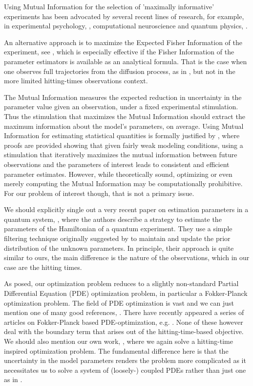 \documentclass{article}
\begin{document}
Using Mutual Information for the selection of 'maximally informative'
experiments has been advocated by several recent lines of research, for example,
in experimental psychology, \cite{Cavagnaro2010,Myung2013}, computational
neuroscience \cite{Paninski2006a,Paninski2005,Lewi2009} and quantum physics,
\cite{Granade2012}.
 
An alternative approach is to maximize the Expected Fisher Information of the
experiment, see \cite{Hooker2015}, which is especially effective if the Fisher
Information of the parameter estimators is available as an analytical formula.
That is the case when one observes full trajectories from the diffusion process,
as in \cite{Hooker2015}, but not in the more limited hitting-times observations
context.
 
The Mutual Information measures the expected reduction in uncertainty in the
parameter value given an observation, under a fixed experimental stimulation.
Thus the stimulation that maximizes the Mutual Information should extract the
maximum information about the model's parameters, on average. Using Mutual
Information for estimating statistical quantities is formally justified by
\cite{Paninski2005}, where proofs are provided showing that given fairly weak
modeling conditions, using a stimulation that iteratively maximizes the mutual
information between future observations and the parameters of interest leads to
consistent and efficient parameter estimates. However, while theoretically
sound, optimizing or even merely computing the Mutual Information may be
computationally prohibitive. For our problem of interest though, that is not a
primary issue.

We should explicitly single out a very recent paper on estimation
parameters in a quantum system,  
\cite{Granade2012}, where the authors describe a strategy to estimate
the parameters of the Hamiltonian of a quantum experiment. They use a simple
filtering technique originally suggested by \cite{Liu2001} to maintain and
update the prior distribution of the unknown parameters. In principle, their
approach is quite similar to ours, the main difference is the nature of the
observations, which in our case are the hitting times.

As posed, our optimization problem reduces to a slightly non-standard Partial
Differential Equation (PDE) optimization problem, in particular a Fokker-Planck
optimization problem. The field of PDE optimization is vast and we can just
mention one of many good references, \cite{Borzi2012}. There have recently
appeared a series of articles on Fokker-Planck based PDE-optimization, e.g.
\cite{Annunziato2010,Annunziato2014}. None of these however deal with the
boundary term that arises out of the hitting-time-based objective. We
should also mention our own work, \cite{Iolov2014a}, where we again solve a
hitting-time inspired optimization problem. The fundamental difference here is
that the uncertainty in the model parameters renders the problem more
complicated as it necessitates us to solve a system of (loosely-) coupled PDEs
rather than just one as in \cite{Iolov2014a}.
\end{document}
